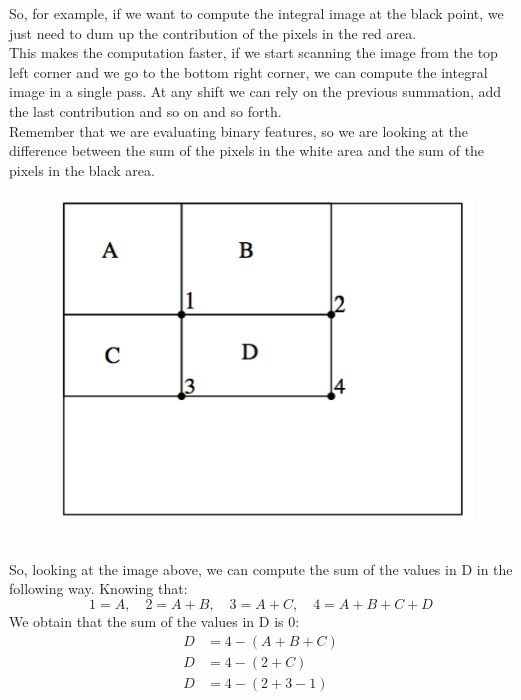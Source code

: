 So, for example, if we want to compute the integral image at the black point, we just need to dum up the contribution of the pixels in the red area.
\\This makes the computation faster, if we start scanning the image from the top left corner and we go to the bottom right corner, we can compute the integral image in a single pass.
At any shift we can rely on the previous summation, add the last contribution and so on and so forth.
\\Remember that we are evaluating binary features, so we are looking at the difference between the sum of the pixels in the white area and the sum of the pixels in the black area.
\begin{figure}[h]
    \centering
    \includegraphics[scale=0.4]{Figures/IntegralImage2.png}
\end{figure}
\\So, looking at the image above, we can compute the sum of the values in D in the following way.
Knowing that: 
\[1 = A,\quad 2 = A + B,\quad 3 = A + C,\quad 4 = A + B + C + D\]
We obtain that the sum of the values in D is $0$:
\begin{equation}
    \begin{split}
        D & = 4 - (A + B + C) \\
        D & = 4 - (2 + C) \\
        D & = 4 - (2 + 3 - 1) 
    \end{split}
\end{equation}
